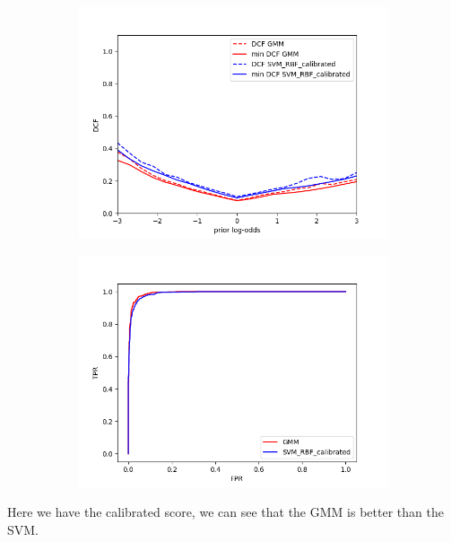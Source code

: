 \documentclass[english]{report}
\begin{document}
\begin{figure}[H]
    \begin{subfigure}{0.5\textwidth}
        \includegraphics[scale=0.5]{../../images/comparison/validation/DCF_GMM&SVM_RBF_calibrated}
    \end{subfigure}
    \begin{subfigure}{0.5\textwidth}
        \includegraphics[scale=0.5]{../../images/comparison/validation/ROC_GMM&SVM_RBF_calibrated}
    \end{subfigure}
    \label{fig:SVMcalibvsGMM}
\end{figure}
Here we have the calibrated score, we can see that the GMM is better than the SVM\@.
\end{document}
